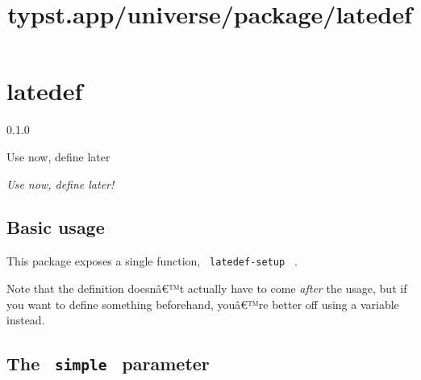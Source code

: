 \title{typst.app/universe/package/latedef}

\label{banner}
\section{latedef}\label{latedef}

{ 0.1.0 }

Use now, define later

\label{readme}
\emph{Use now, define later!}

\subsection{Basic usage}\label{basic-usage}

This package exposes a single function, \texttt{\ latedef-setup\ } .

\begin{Shaded}
\begin{Highlighting}[]

\end{Highlighting}
\end{Shaded}


Note that the definition doesnâ€™t actually have to come \emph{after}
the usage, but if you want to define something beforehand, youâ€™re
better off using a variable instead.

\begin{Shaded}
\begin{Highlighting}[]


\end{Highlighting}
\end{Shaded}


\subsection{\texorpdfstring{The \texttt{\ simple\ }
parameter}{The  simple  parameter}}\label{the-simple-parameter}

